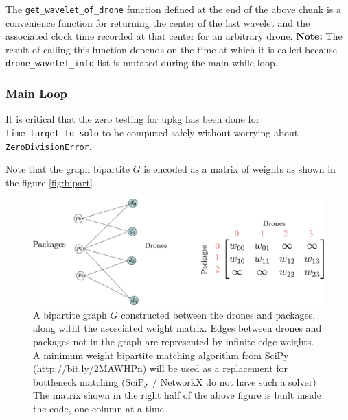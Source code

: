 \documentclass[10pt, english, oneside]{report}
\begin{document}
 The \verb|get_wavelet_of_drone| function defined at the end of the above chunk is a convenience function 
 for returning the center of the last wavelet and the associated clock time recorded at that center
 for an arbitrary drone.  \textbf{Note:} The result of calling this function depends on the time at which it 
 is called because \verb|drone_wavelet_info| list is mutated during the main while loop.

\subsubsection{Main Loop}
\label{ssec:mainloopmatchmove}




It is critical that the zero testing for upkg has 
been done for \verb|time_target_to_solo| to be computed safely 
without worrying about \verb|ZeroDivisionError|.

Note that the graph bipartite $G$ is encoded as a matrix of weights as shown in the 
figure \autoref{fig:bipart}

\begin{figure}[H]
\centering
\includegraphics[width=17cm]{docs/bipartgraph_demo.pdf}
\caption{A bipartite graph $G$ constructed between the drones 
and packages, along witht the asosciated weight matrix. Edges between
drones and packages not in the graph are represented by infinite edge 
weights. A minimum weight bipartite matching algorithm from SciPy (\url{http://bit.ly/2MAWHPn}) will 
be used as a replacement for bottleneck matching (SciPy / NetworkX do not 
have such a solver) The matrix shown in the right half of the above figure is 
built inside the code, one column at a time. }
\end{figure}
\label{fig:bipart}
\end{document}
